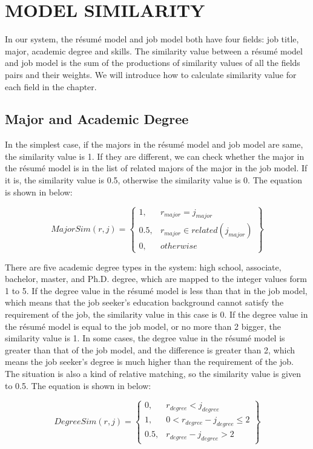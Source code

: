 \chapter{MODEL SIMILARITY}

In our system, the r\'esum\'e model and job model both have four fields: job title, major, academic degree and skills. The similarity value between a r\'esum\'e model and job model is the sum of the productions of similarity values of all the fields pairs and their weights. We will introduce how to calculate similarity value for each field in the chapter.

\section{Major and Academic Degree}

In the simplest case, if the majors in the r\'esum\'e model and job model are same, the similarity value is 1. If they are different, we can check whether the major in the r\'esum\'e model is in the list of related majors of the major in the job model. If it is, the similarity value is 0.5, otherwise the similarity value is 0. The equation is shown in below:

$$ MajorSim(r,j ) = \begin{Bmatrix}
1, & r_{major} = j_{major} \\
0.5, & r_{major} \in related( j_{major} ) \\
0, & otherwise
\end{Bmatrix} $$

There are five academic degree types in the system:  high school, associate, bachelor, master, and Ph.D. degree, which are mapped to the integer values form 1 to 5. If the degree value in the r\'esum\'e model is less than that in the job model, which means that the job seeker's education background cannot satisfy the requirement of the job, the similarity value in this case is 0. If the degree value in the r\'esum\'e model is equal to the job model, or no more than 2 bigger, the similarity value is 1. In some cases, the degree value in the r\'esum\'e model is greater than that of the job model, and the difference is greater than 2, which means the job seeker's degree is much higher than the requirement of the job. The situation is also a kind of relative matching, so the similarity value is given to 0.5. The equation is shown in below:

$$ DegreeSim(r,j ) = \begin{Bmatrix}
0,   & r_{degree} < j_{degree} \\
1,   & 0 < r_{degree} - j_{degree} \leqslant 2  \\
0.5, & r_{degree} - j_{degree} > 2
\end{Bmatrix} $$

